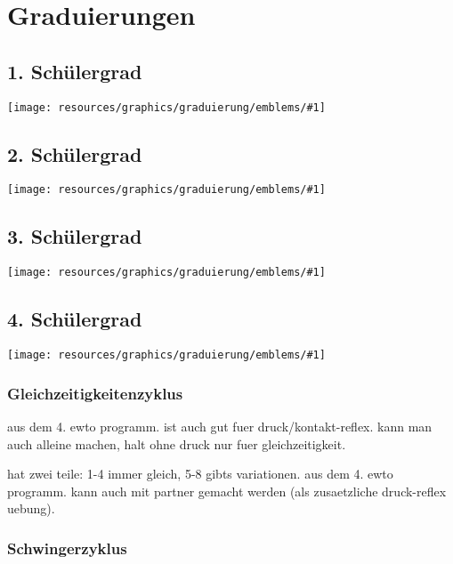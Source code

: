 
\newenvironment{WTGradSG}[1]{
	\section{#1. Sch\"ulergrad}
	\texttt{[image: resources/graphics/graduierung/emblems/\#1]}
}{
}


\renewcommand\chapterillustration{pushing_minimalistisch}
\chapter{Graduierungen}



\begin{WTGradSG}{1}

\end{WTGradSG}
\begin{WTGradSG}{2}

\end{WTGradSG}
\begin{WTGradSG}{3}

\end{WTGradSG}
\begin{WTGradSG}{4}


\subsection{Gleichzeitigkeitenzyklus}

aus dem 4. ewto programm.
ist auch gut fuer druck/kontakt-reflex.
kann man auch alleine machen, halt ohne druck nur fuer gleichzeitigkeit.

hat zwei teile: 1-4 immer gleich, 5-8 gibts variationen.
aus dem 4. ewto programm.
kann auch mit partner gemacht werden (als zusaetzliche druck-reflex uebung).

\subsection{Schwingerzyklus}


\end{WTGradSG}

